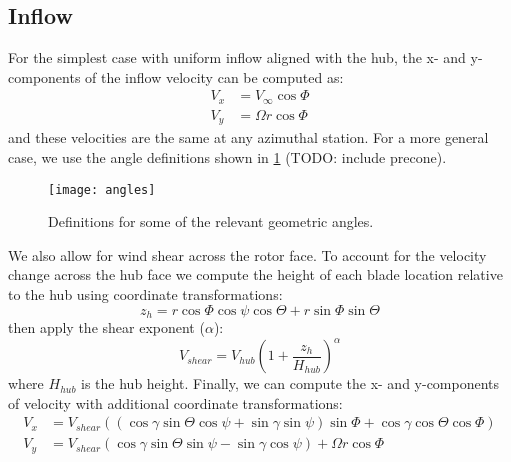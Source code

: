 


\subsection{Inflow}

For the simplest case with uniform inflow aligned with the hub, the x- and y-components of the inflow velocity can be computed as:
\begin{equation}
\begin{aligned}
    V_x &= V_\infty \cos\Phi\\
    V_y &= \Omega r \cos\Phi
\end{aligned}
\end{equation}
and these velocities are the same at any azimuthal station.  For a more general case, we use the angle definitions shown in \cref{fig:angles} (TODO: include precone).
\begin{figure}[htbp]
\centering
\texttt{[image: angles]}
\caption{Definitions for some of the relevant geometric angles.}
\label{fig:angles}
\end{figure}
We also allow for wind shear across the rotor face.  To account for the velocity change across the hub face we compute the height of each blade location relative to the hub using coordinate transformations:
\begin{equation}
    z_h = r \cos\Phi \cos\psi \cos\Theta + r \sin\Phi\sin\Theta
\end{equation}
then apply the shear exponent ($\alpha$):
\begin{equation}
    V_{shear} = V_{hub} \left(1 + \frac{z_h}{H_{hub}} \right)^\alpha
\end{equation}
where $H_{hub}$ is the hub height.  Finally, we can compute the x- and y-components of velocity with additional coordinate transformations:
\begin{equation}
\begin{aligned}
V_x &= V_{shear} ((\cos \gamma \sin \Theta \cos \psi + \sin \gamma \sin \psi)\sin \Phi + \cos \gamma \cos \Theta \cos \Phi)\\
V_y &= V_{shear} (\cos \gamma \sin \Theta\sin \psi - \sin \gamma \cos \psi) + \Omega r \cos\Phi
\end{aligned}
\end{equation}

